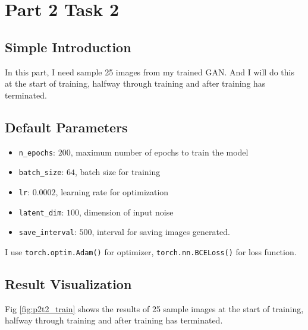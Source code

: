 \section{Part 2 Task 2}

\subsection{Simple Introduction}

In this part, I need sample 25 images from my trained GAN. And I will do this at the start of training, halfway through training and after training has terminated.

\subsection{Default Parameters}

\begin{itemize}
  \item \texttt{n\_epochs}: $200$, maximum number of epochs to train the model
  \item \texttt{batch\_size}: $64$, batch size for training
  \item \texttt{lr}: $0.0002$, learning rate for optimization
  \item \texttt{latent\_dim}: $100$, dimension of input noise
  \item \texttt{save\_interval}: $500$, interval for saving images generated.
\end{itemize}

I use \texttt{torch.optim.Adam()} for optimizer, \texttt{torch.nn.BCELoss()} for loss function.

\subsection{Result Visualization}

Fig \ref{fig:p2t2_train} shows the results of 25 sample images at the start of training, halfway through training and after training has terminated.

